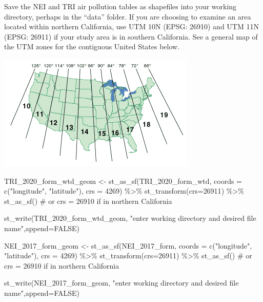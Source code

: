 \documentclass[
  letterpaper,
  DIV=11,
  numbers=noendperiod]{scrartcl}
\newenvironment{Shaded}{\begin{snugshade}}{\end{snugshade}}
\newcommand{\AttributeTok}[1]{\textcolor[rgb]{0.40,0.45,0.13}{#1}}
\newcommand{\CommentTok}[1]{\textcolor[rgb]{0.37,0.37,0.37}{#1}}
\newcommand{\ConstantTok}[1]{\textcolor[rgb]{0.56,0.35,0.01}{#1}}
\newcommand{\DecValTok}[1]{\textcolor[rgb]{0.68,0.00,0.00}{#1}}
\newcommand{\FunctionTok}[1]{\textcolor[rgb]{0.28,0.35,0.67}{#1}}
\newcommand{\NormalTok}[1]{\textcolor[rgb]{0.00,0.23,0.31}{#1}}
\newcommand{\OtherTok}[1]{\textcolor[rgb]{0.00,0.23,0.31}{#1}}
\newcommand{\SpecialCharTok}[1]{\textcolor[rgb]{0.37,0.37,0.37}{#1}}
\newcommand{\StringTok}[1]{\textcolor[rgb]{0.13,0.47,0.30}{#1}}
\begin{document}
Save the NEI and TRI air pollution tables as shapefiles into your
working directory, perhaps in the ``data'' folder. If you are choosing
to examine an area located within northern California, use UTM 10N
(EPSG: 26910) and UTM 11N (EPSG: 26911) if your study area is in
southern California. See a general map of the UTM zones for the
contiguous United States below.

\includegraphics{images/fig44.gif}

\begin{Shaded}
\begin{Highlighting}[]
\NormalTok{TRI\_2020\_form\_wtd\_geom }\OtherTok{\textless{}{-}} \FunctionTok{st\_as\_sf}\NormalTok{(TRI\_2020\_form\_wtd, }\AttributeTok{coords =} \FunctionTok{c}\NormalTok{(}\StringTok{"longitude"}\NormalTok{, }\StringTok{"latitude"}\NormalTok{), }\AttributeTok{crs =} \DecValTok{4269}\NormalTok{) }\SpecialCharTok{\%\textgreater{}\%} \FunctionTok{st\_transform}\NormalTok{(}\AttributeTok{crs=}\DecValTok{26911}\NormalTok{) }\SpecialCharTok{\%\textgreater{}\%}
  \FunctionTok{st\_as\_sf}\NormalTok{() }\CommentTok{\# or crs = 26910 if in northern California}

\FunctionTok{st\_write}\NormalTok{(TRI\_2020\_form\_wtd\_geom, }\StringTok{"enter working directory and desired file name"}\NormalTok{,}\AttributeTok{append=}\ConstantTok{FALSE}\NormalTok{)}

\NormalTok{NEI\_2017\_form\_geom }\OtherTok{\textless{}{-}} \FunctionTok{st\_as\_sf}\NormalTok{(NEI\_2017\_form, }\AttributeTok{coords =} \FunctionTok{c}\NormalTok{(}\StringTok{"longitude"}\NormalTok{, }\StringTok{"latitude"}\NormalTok{), }\AttributeTok{crs =} \DecValTok{4269}\NormalTok{) }\SpecialCharTok{\%\textgreater{}\%} \FunctionTok{st\_transform}\NormalTok{(}\AttributeTok{crs=}\DecValTok{26911}\NormalTok{) }\SpecialCharTok{\%\textgreater{}\%}
  \FunctionTok{st\_as\_sf}\NormalTok{() }\CommentTok{\# or crs = 26910 if in northern California}

\FunctionTok{st\_write}\NormalTok{(NEI\_2017\_form\_geom, }\StringTok{"enter working directory and desired file name"}\NormalTok{,}\AttributeTok{append=}\ConstantTok{FALSE}\NormalTok{)}
\end{Highlighting}
\end{Shaded}
\end{document}
